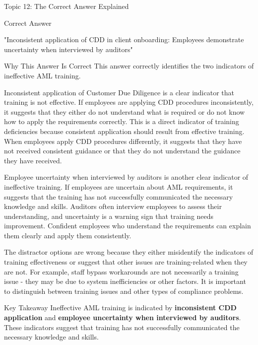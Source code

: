 \documentclass[8pt]{beamer}  %
\newcommand{\correct}{\textcolor{correctgreen}{\ding{51}}}
\begin{document}
	\begin{frame}{Topic 12: The Correct Answer Explained}
		\begin{block}{\large \correct \textcolor{correctgreen}{Correct Answer}}
			\begin{center}
				\Large "Inconsistent application of CDD in client onboarding: Employees demonstrate uncertainty when interviewed by auditors"
			\end{center}
		\end{block}
		
		\vspace{0.2cm}
		\begin{block}{\large Why This Answer Is Correct}
			This answer correctly identifies the two indicators of ineffective AML training.
			
			Inconsistent application of Customer Due Diligence is a clear indicator that training is not effective. If employees are applying CDD procedures inconsistently, it suggests that they either do not understand what is required or do not know how to apply the requirements correctly. This is a direct indicator of training deficiencies because consistent application should result from effective training. When employees apply CDD procedures differently, it suggests that they have not received consistent guidance or that they do not understand the guidance they have received.
			
			Employee uncertainty when interviewed by auditors is another clear indicator of ineffective training. If employees are uncertain about AML requirements, it suggests that the training has not successfully communicated the necessary knowledge and skills. Auditors often interview employees to assess their understanding, and uncertainty is a warning sign that training needs improvement. Confident employees who understand the requirements can explain them clearly and apply them consistently.
			
			The distractor options are wrong because they either misidentify the indicators of training effectiveness or suggest that other issues are training-related when they are not. For example, staff bypass workarounds are not necessarily a training issue - they may be due to system inefficiencies or other factors. It is important to distinguish between training issues and other types of compliance problems.
		\end{block}
		
		\begin{alertblock}{Key Takeaway}
			Ineffective AML training is indicated by \textbf{inconsistent CDD application} and \textbf{employee uncertainty when interviewed by auditors}. These indicators suggest that training has not successfully communicated the necessary knowledge and skills.
		\end{alertblock}
	\end{frame}
	
\end{document}
